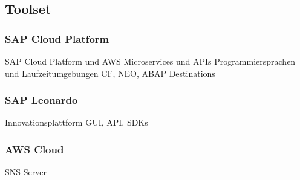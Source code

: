 \subsection{Toolset}
\subsubsection{SAP Cloud Platform}

SAP Cloud Platform und AWS Microservices und APIs
Programmiersprachen und Laufzeitumgebungen
CF, NEO, ABAP
Destinations

\subsubsection{SAP Leonardo}
Innovationsplattform
GUI, API, SDKs

\subsubsection{AWS Cloud}
SNS-Server

\newpage